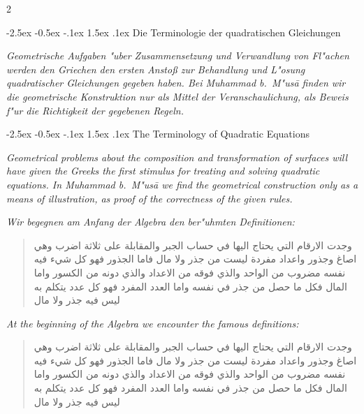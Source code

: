 \documentclass[10pt,a4paper]{article}
\makeatletter
\newcommand{\RL}[1]{\beginR#1\endR}
\newcommand{\ar}[1]{{\arabicfont\RL{#1}}}
\renewcommand{\section}{\@startsection{section}{1}{\z@}%
  {-2.5ex \@plus -0.5ex \@minus -.1ex}%
  {1.5ex \@plus .1ex}%
  {\normalfont\large\bfseries\color{sectioncolor}}}
\makeatother
\begin{document}
\begin{paracol}{2}

\section{Die Terminologie der quadratischen Gleichungen}

\textit{Geometrische Aufgaben "uber Zusammensetzung und Verwandlung von Fl"achen werden den Griechen den ersten Ansto\ss{} zur Behandlung und L"osung quadratischer Gleichungen gegeben haben. Bei Muhammad b.\ M"us\=a finden wir die geometrische Konstruktion nur als Mittel der Veranschaulichung, als Beweis f"ur die Richtigkeit der gegebenen Regeln.}

\switchcolumn

\section{The Terminology of Quadratic Equations}

\textit{Geometrical problems about the composition and transformation of surfaces will have given the Greeks the first stimulus for treating and solving quadratic equations. In Muhammad b.\ M"us\=a we find the geometrical construction only as a means of illustration, as proof of the correctness of the given rules.}

\switchcolumn*

\textit{Wir begegnen am Anfang der Algebra den ber"uhmten Definitionen:}

\begin{quote}
\ar{وجدت الارقام التي يحتاج اليها في حساب الجبر والمقابلة على ثلاثة اضرب وهي اصاغ وجذور واعداد مفردة ليست من جذر ولا مال فاما الجذور فهو كل شيء فيه نفسه مضروب من الواحد والذي فوقه من الاعداد والذي دونه من الكسور واما المال فكل ما حصل من جذر في نفسه واما العدد المفرد فهو كل عدد يتكلم به ليس فيه جذر ولا مال}
\end{quote}

\switchcolumn

\textit{At the beginning of the Algebra we encounter the famous definitions:}

\begin{quote}
\ar{وجدت الارقام التي يحتاج اليها في حساب الجبر والمقابلة على ثلاثة اضرب وهي اصاغ وجذور واعداد مفردة ليست من جذر ولا مال فاما الجذور فهو كل شيء فيه نفسه مضروب من الواحد والذي فوقه من الاعداد والذي دونه من الكسور واما المال فكل ما حصل من جذر في نفسه واما العدد المفرد فهو كل عدد يتكلم به ليس فيه جذر ولا مال}
\end{quote}


\end{paracol}
\end{document}

